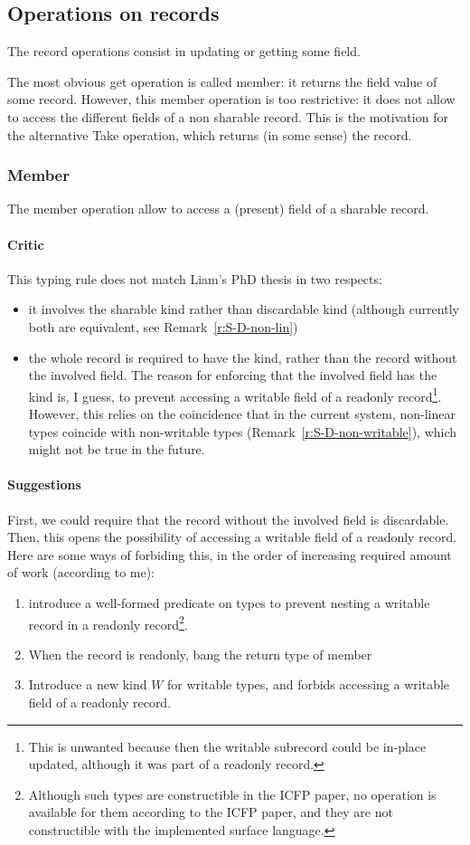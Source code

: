 \documentclass{article}
\begin{document}

\subsection{Operations on records}
The record operations consist in updating or getting some field.

The most obvious get operation is called member: it returns the field value
of some record. However, this member operation is too restrictive: 
it does not allow to access the different fields of a non sharable record.
This is the motivation for the alternative Take operation,
which returns (in some sense) the record.
\subsubsection{Member}
The member operation allow to
access a (present) field
of a
sharable record.

\paragraph{Critic} This typing rule does not match Liam's PhD thesis in two
respects:
\begin{itemize}
\item it involves the sharable kind rather than discardable kind (although currently
  both are equivalent, see Remark~\ref{r:S-D-non-lin})
  \item the whole record is required to have the kind, rather than the record
    without the involved field.
    The reason for enforcing that the involved field has the kind
    is, I guess, to prevent accessing a writable field of a readonly
    record\footnote{This is unwanted because then the writable subrecord could
      be in-place updated, although it was part of a readonly record.}. However, this
    relies on the coincidence that in the current system, non-linear types
    coincide with non-writable types (Remark~\ref{r:S-D-non-writable}), which
    might not be true in the future.
\end{itemize}
\paragraph{Suggestions}
First, we could require that the record without the involved field is discardable.
Then, this opens the possibility of accessing a writable field of a readonly
record.
Here are some ways of forbiding this, in the order of increasing required amount of work (according to me):
\begin{enumerate}
\item introduce a well-formed predicate on types to prevent nesting a writable record in a readonly
  record\footnote{Although such types are constructible in the ICFP paper, no
    operation is available for them according to the ICFP paper, and
    they are not constructible with the implemented surface language.}.
\item When the record is readonly, bang the return type of member
  \item Introduce a new kind $W$ for writable types, and forbids accessing a writable
    field of a readonly record.
\end{enumerate}
\end{document}
